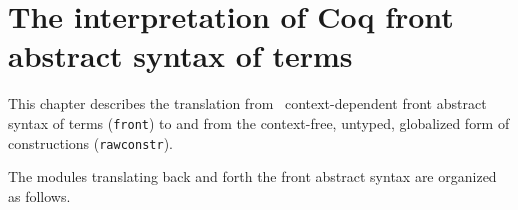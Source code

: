 
\newpage
\section*{The interpretation of Coq front abstract syntax of terms}

\ocwsection \label{interp}
This chapter describes the translation from \Coq\ context-dependent
front abstract syntax of terms (\verb=front=) to and from the
context-free, untyped, globalized form of constructions (\verb=rawconstr=).

The modules translating back and forth the front abstract syntax are
organized as follows.

\bigskip
\begin{center}\end{center}
